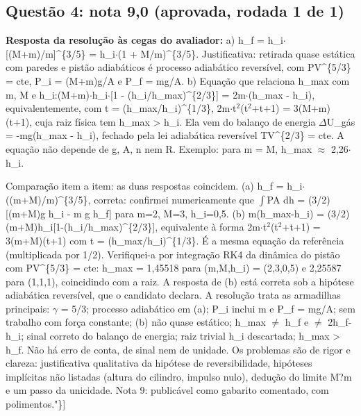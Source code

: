 \documentclass{article}%
\begin{document}
\subsection*{Questão 4: nota 9,0 (aprovada, rodada 1 de 1)}%
\textbf{Resposta da resolução às cegas do avaliador:} a) h\_f = h\_i$\cdot${[}(M+m)/m{]}\^{}\{3/5\} = h\_i$\cdot$(1 + M/m)\^{}\{3/5\}. Justificativa: retirada quase estática com paredes e pistão adiabáticos é processo adiabático reversível, com PV\^{}\{5/3\} = cte, P\_i = (M+m)g/A e P\_f = mg/A.\newline%
\newline%
b) Equação que relaciona h\_max com m, M e h\_i:(M+m)$\cdot$h\_i$\cdot${[}1 - (h\_i/h\_max)\^{}\{2/3\}{]} = 2m$\cdot$(h\_max - h\_i),\newline%
equivalentemente, com t = (h\_max/h\_i)\^{}\{1/3\}, 2m$\cdot$t$^2$(t$^2$+t+1) = 3(M+m)(t+1), cuja raiz física tem h\_max > h\_i. Ela vem do balanço de energia $\Delta$U\_gás = -mg(h\_max - h\_i), fechado pela lei adiabática reversível TV\^{}\{2/3\} = cte. A equação não depende de g, A, n nem R. Exemplo: para m = M, h\_max $\approx$ 2,26$\cdot$h\_i.\par %
Comparação item a item: as duas respostas coincidem. (a) h\_f = h\_i$\cdot$((m+M)/m)\^{}\{3/5\}, correta: confirmei numericamente que $\int$PA dh = (3/2){[}(m+M)g h\_i - m g h\_f{]} para m=2, M=3, h\_i=0,5. (b) m(h\_max-h\_i) = (3/2)(m+M)h\_i{[}1-(h\_i/h\_max)\^{}\{2/3\}{]}, equivalente à forma 2m$\cdot$t$^2$(t$^2$+t+1) = 3(m+M)(t+1) com t = (h\_max/h\_i)\^{}\{1/3\}. É a mesma equação da referência (multiplicada por 1/2). Verifiquei{-}a por integração RK4 da dinâmica do pistão com PV\^{}\{5/3\} = cte: h\_max = 1,45518 para (m,M,h\_i) = (2,3,0,5) e 2,25587 para (1,1,1), coincidindo com a raiz. A resposta de (b) está correta sob a hipótese adiabática reversível, que o candidato declara. A resolução trata as armadilhas principais: $\gamma$ = 5/3; processo adiabático em (a); P\_i inclui m e P\_f = mg/A; sem trabalho com força constante; (b) não quase estático; h\_max $\neq$ h\_f e $\neq$ 2h\_f-h\_i; sinal correto do balanço de energia; raiz trivial h\_i descartada; h\_max > h\_f. Não há erro de conta, de sinal nem de unidade. Os problemas são de rigor e clareza: justificativa qualitativa da hipótese de reversibilidade, hipóteses implícitas não listadas (altura do cilindro, impulso nulo), dedução do limite M?m e um passo da unicidade. Nota 9: publicável como gabarito comentado, com polimentos."\}{]}%
\end{document}
